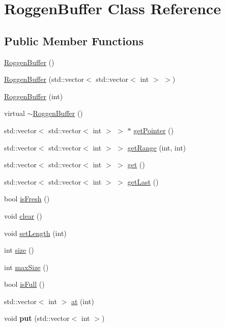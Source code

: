 \hypertarget{classRoggenBuffer}{
\section{RoggenBuffer Class Reference}
\label{classRoggenBuffer}
}
\subsection*{Public Member Functions}
\begin{DoxyCompactItemize}
\item 
\hyperlink{classRoggenBuffer_a64573713834ff7772db6e180d9b34be6}{RoggenBuffer} ()
\item 
\hyperlink{classRoggenBuffer_a54b6110634f1f2d1a38552d58b841bf8}{RoggenBuffer} (std::vector$<$ std::vector$<$ int $>$ $>$)
\item 
\hyperlink{classRoggenBuffer_aaff7360a2f18576aeb9a5164a6cf6eec}{RoggenBuffer} (int)
\item 
virtual \hyperlink{classRoggenBuffer_a575b9194c53270add2d11e119d070293}{$\sim$RoggenBuffer} ()
\item 
std::vector$<$ std::vector$<$ int $>$ $>$ $\ast$ \hyperlink{classRoggenBuffer_a5fab9575ec2f4038c394009f689bffb7}{getPointer} ()
\item 
std::vector$<$ std::vector$<$ int $>$ $>$ \hyperlink{classRoggenBuffer_ad952a6eec2e3aea2a071f191c0decd36}{getRange} (int, int)
\item 
std::vector$<$ std::vector$<$ int $>$ $>$ \hyperlink{classRoggenBuffer_a7e4c7aa19aa7c900e2bbf00d23c698a1}{get} ()
\item 
std::vector$<$ std::vector$<$ int $>$ $>$ \hyperlink{classRoggenBuffer_a1c1ee753d0654159c62a0ee4ae95d9a0}{getLast} ()
\item 
bool \hyperlink{classRoggenBuffer_a1e2fe9957cfdf7db79678d929809efb0}{isFresh} ()
\item 
void \hyperlink{classRoggenBuffer_a199b6d0b632b4d9447a2ad85514d0872}{clear} ()
\item 
void \hyperlink{classRoggenBuffer_ad37f32dca74267b357a68c781920b08b}{setLength} (int)
\item 
int \hyperlink{classRoggenBuffer_aa74b37a710412767fa3bfcbf7f7c1958}{size} ()
\item 
int \hyperlink{classRoggenBuffer_ad64ee4593f5d4c488f3f18a9c0c558ab}{maxSize} ()
\item 
bool \hyperlink{classRoggenBuffer_a7eefcb649046e2e5929b76c890b07269}{isFull} ()
\item 
std::vector$<$ int $>$ \hyperlink{classRoggenBuffer_a81e4f32e486a0ae052bbe25088ccaffc}{at} (int)
\item 
\hypertarget{classRoggenBuffer_adcbbd2883819c7af9cf20ed95bbeb563}{
void {\bfseries put} (std::vector$<$ int $>$)}
\label{classRoggenBuffer_adcbbd2883819c7af9cf20ed95bbeb563}


\end{DoxyCompactItemize}
